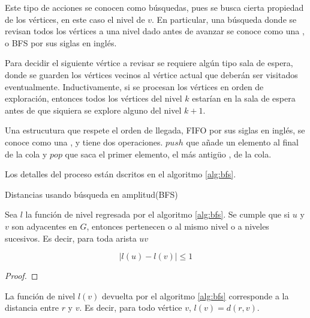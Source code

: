 Este tipo de acciones se conocen como búsquedas, pues se busca cierta propiedad
de los vértices, en este caso el nivel de $v$. En particular, una búsqueda donde
se revisan todos los vértices a una nivel dado antes de avanzar se conoce como
una , o BFS por sus siglas en inglés.

Para decidir el siguiente vértice a revisar se requiere algún tipo sala de
espera, donde se guarden los vértices vecinos al vértice actual que deberán ser
visitados eventualmente. Inductivamente, si se procesan los vértices en orden de
exploración, entonces todos los vértices del nivel $k$ estarían en la sala de
espera antes de que siquiera se explore alguno del nivel $k+1$.

Una estrucutura que respete el orden de llegada, FIFO por sus siglas en inglés,
se conoce como una , y tiene dos operaciones. $push$ que añade un
elemento al final de la cola y $pop$ que saca el primer elemento, el más antigüo
, de la cola.

Los detalles del proceso están dscritos en el algoritmo \ref{alg:bfs}.

\begin{algorithm}
  \caption{Distancias usando búsqueda en amplitud(BFS)}
  \label{alg:bfs}
  \begin{algorithmic}[1]
    \EndIf
    \EndFor
    \EndWhile
    \State {}
  \end{algorithmic}
\end{algorithm}

\begin{proposition}
  Sea $l$ la función de nivel regresada por el algoritmo \ref{alg:bfs}. Se
  cumple que si $u$ y $v$ son adyacentes en $G$, entonces pertenecen o al mismo
  nivel o a niveles sucesivos. Es decir, para toda arista $uv$

  \[
    |l(u) - l(v)| \leq 1
  \]
\end{proposition}

\begin{proof}

\end{proof}

\begin{theorem}
  La función de nivel $l(v)$ devuelta por el algoritmo \ref{alg:bfs} corresponde
  a la distancia entre $r$ y $v$. Es decir, para todo vértice $v$, $l(v) =
  d(r, v)$.
\end{theorem}

